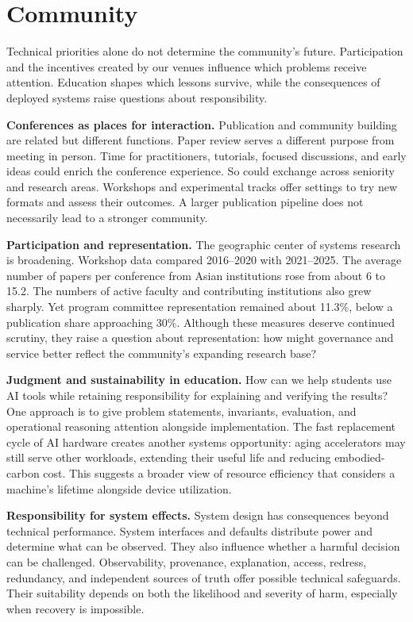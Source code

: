 \documentclass[manuscript]{acmart}
\begin{document}
\section{Community}

Technical priorities alone do not determine the community's future.
Participation and the incentives created by our venues influence which problems receive attention.
Education shapes which lessons survive, while the consequences of deployed systems raise questions about responsibility.

\textbf{Conferences as places for interaction.}
Publication and community building are related but different functions.
Paper review serves a different purpose from meeting in person.
Time for practitioners, tutorials, focused discussions, and early ideas could enrich the conference experience.
So could exchange across seniority and research areas.
Workshops and experimental tracks offer settings to try new formats and assess their outcomes.
A larger publication pipeline does not necessarily lead to a stronger community.

\textbf{Participation and representation.} The geographic center of systems research is broadening.
Workshop data compared 2016--2020 with 2021--2025.
The average number of papers per conference from Asian institutions rose from about 6 to 15.2.
The numbers of active faculty and contributing institutions also grew sharply.
Yet program committee representation remained about 11.3\%, below a publication share approaching 30\%.
Although these measures deserve continued scrutiny, they raise a question about representation:
how might governance and service better reflect the community's expanding research base?

\textbf{Judgment and sustainability in education.} How can we help students use AI tools while retaining responsibility for explaining and verifying the results?
One approach is to give problem statements, invariants, evaluation, and operational reasoning attention alongside implementation.
The fast replacement cycle of AI hardware creates another systems opportunity:
aging accelerators may still serve other workloads, extending their useful life and reducing embodied-carbon cost.
This suggests a broader view of resource efficiency that considers a machine's lifetime alongside device utilization.

\textbf{Responsibility for system effects.} System design has consequences beyond technical performance.
System interfaces and defaults distribute power and determine what can be observed.
They also influence whether a harmful decision can be challenged.
Observability, provenance, explanation, access, redress, redundancy, and independent sources of truth offer possible technical safeguards.
Their suitability depends on both the likelihood and severity of harm, especially when recovery is impossible.
\end{document}
